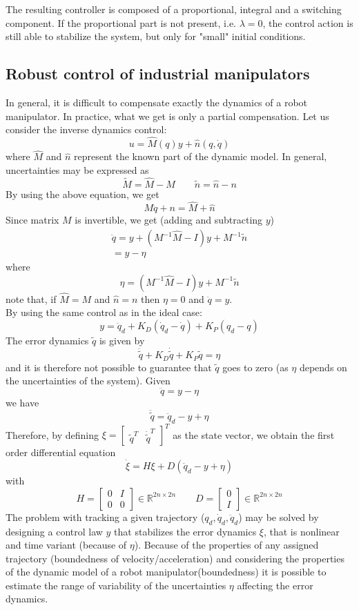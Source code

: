 \documentclass{book}
\begin{document}
The resulting controller is composed of a proportional, integral and a switching component. If the proportional part is not present, i.e. $\lambda = 0$, the control action is still able to stabilize the system, but only for "small" initial conditions. 

\subsection{Robust control of industrial manipulators}
In general, it is difficult to compensate exactly the dynamics of a robot manipulator. In practice, what we get is only a partial compensation. Let us consider the inverse dynamics control:
\[
    u=\hat{M}(q)y+\hat{n}(q,\dot{q})
\]
where $\hat{M}$ and $\hat{n}$ represent the known part of the dynamic model. In general, uncertainties may be expressed as 
\[
    \tilde{M}=\hat{M}-M \qquad \tilde{n} = \hat{n} - n
\]
By using the above equation, we get
\[
    M\ddot{q}+n=\hat{M}+\hat{n}
\]
Since matrix $M$ is invertible, we get (adding and subtracting $y$)
\begin{gather*}
    \ddot{q} = y + (M^{-1}\hat{M}-I)y+M^{-1}\tilde{n}\\
    =y-\eta
\end{gather*}
where
\[
    \eta = (M^{-1}\hat{M}-I)y+M^{-1}\tilde{n}
\]
note that, if $\hat{M}=M$ and $\hat{n}=n$ then $\eta=0$ and $\ddot{q}=y$.\\
By using the same control as in the ideal case:
\[
    y=\ddot{q}_d+K_D(\dot{q}_d-\dot{q})+K_P(q_d-q)
\]
The error dynamics $\tilde{q}$ is given by 
\[
    \ddot{\tilde{q}}+K_D\dot{\tilde{q}} + K_P\tilde{q}=\eta
\]
and it is therefore not possible to guarantee that $\tilde{q}$ goes to zero (as $\eta$ depends on the uncertainties of the system).
Given
\[
    \ddot{q}=y-\eta
\]
we have 
\[
    \ddot{\tilde{q}}=\ddot{q}_d-y+\eta
\]
Therefore, by defining $\xi = \begin{bmatrix}
    \tilde{q}^T  & \dot{\tilde{q}}^T
\end{bmatrix}^T $ as the state vector, we obtain the first order differential equation
\[
    \dot{\xi} = H\xi + D(\ddot{q}_d-y+\eta)
\]
with
\[
    H=\begin{bmatrix}
        0 & I \\ 0 & 0
    \end{bmatrix} \in \mathbb{R}^{2n\times 2n} \qquad D = \begin{bmatrix}
        0 \\ I
    \end{bmatrix} \in \mathbb{R}^{2n\times 2n}
\]
The problem with tracking a given trajectory ($q_d,\dot{q}_d,\ddot{q}_d$) may be solved by designing a control law $y$ that stabilizes the error dynamics $\xi$, that is nonlinear and time variant (because of $\eta$). Because of the properties of any assigned trajectory (boundedness of velocity/acceleration) and considering the properties of the dynamic model of a robot manipulator(boundedness) it is possible to estimate the range of variability of the uncertainties $\eta$ affecting the error dynamics. 
\end{document}
